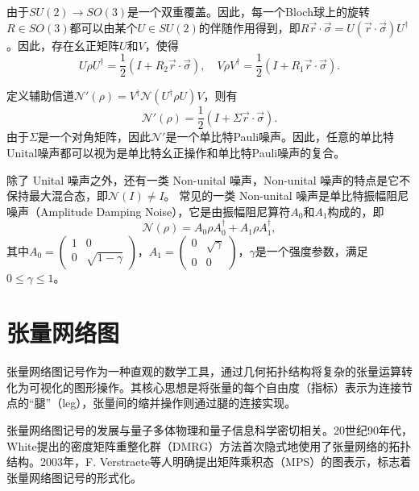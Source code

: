 由于$SU(2)\longrightarrow SO(3)$是一个双重覆盖。因此，每一个Bloch球上的旋转$R\in SO(3)$都可以由某个$U\in SU(2)$的伴随作用得到，即$R\vec{r}\cdot\vec{\sigma} = U (\vec{r}\cdot\vec{\sigma})U^\dagger$。因此，存在幺正矩阵$U$和$V$，使得
\begin{equation}
    U\rho U^\dagger = \frac{1}{2}(I + R_2\vec{r}\cdot\vec{\sigma}), \quad V\rho V^\dagger = \frac{1}{2}(I + R_1\vec{r}\cdot\vec{\sigma}).
\end{equation}

定义辅助信道$\mathcal{N'}(\rho) = V^\dagger \mathcal{N}(U^\dagger \rho U)V$，则有
\begin{equation}
    \mathcal{N'}(\rho) = \frac{1}{2}(I + \Sigma\vec{r}\cdot\vec{\sigma}).
\end{equation}
由于$\Sigma$是一个对角矩阵，因此$\mathcal{N'}$是一个单比特Pauli噪声。因此，任意的单比特Unital噪声都可以视为是单比特幺正操作和单比特Pauli噪声的复合。

除了 Unital 噪声之外，还有一类 Non-unital 噪声，Non-unital 噪声的特点是它不保持最大混合态，即$\mathcal{N}(I) \neq I$。
常见的一类 Non-unital 噪声是单比特振幅阻尼噪声（Amplitude Damping Noise），它是由振幅阻尼算符$A_0$和$A_1$构成的，即
\begin{equation}
    \mathcal{N}(\rho) = A_0\rho A_0^\dagger + A_1\rho A_1^\dagger,
\end{equation}
其中$A_0 = \begin{pmatrix} 1 & 0 \\ 0 & \sqrt{1-\gamma} \end{pmatrix}$，$A_1 = \begin{pmatrix} 0 & \sqrt{\gamma} \\ 0 & 0 \end{pmatrix}$，$\gamma$是一个强度参数，满足$0 \leq \gamma \leq 1$。


\section{张量网络图}


张量网络图记号作为一种直观的数学工具，通过几何拓扑结构将复杂的张量运算转化为可视化的图形操作。其核心思想是将张量的每个自由度（指标）表示为连接节点的“腿”（leg），张量间的缩并操作则通过腿的连接实现。

张量网络图记号的发展与量子多体物理和量子信息科学密切相关。20世纪90年代，White提出的密度矩阵重整化群（DMRG）方法首次隐式地使用了张量网络的拓扑结构。2003年，F. Verstraete等人明确提出矩阵乘积态（MPS）的图表示，标志着张量网络图记号的形式化。


